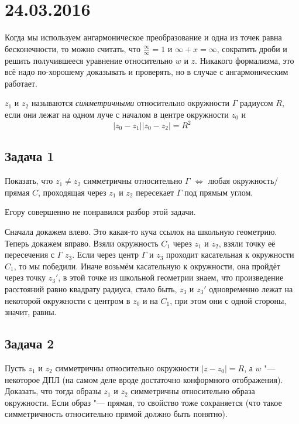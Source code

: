 \chapter{24.03.2016}

\begin{Rem}
	Когда мы используем ангармоническое преобразование и одна из точек равна бесконечности,
	то можно считать, что $\frac{\infty}{\infty}=1$ и $\infty+x=\infty$, сократить дроби и
	решить получившееся уравнение относительно $w$ и $z$.
	Никакого формализма, это всё надо по-хорошему доказывать и проверять, но в случае с ангармоническим работает.
\end{Rem}

\begin{Def}
	$z_1$  и $z_2$ называются \textit{симметричными} относительно окружности $\Gamma$ радиусом $R$,
	если они лежат на одном луче с началом в центре окружности $z_0$ и
	\[ |z_0-z_1||z_0-z_2| = R^2 \]
\end{Def}

\section{Задача 1}
	Показать, что $z_1 \neq z_2$ симметричны относительно $\Gamma$ $\iff$
	любая окружность/прямая $C$, проходящая через $z_1$ и $z_2$ пересекает $\Gamma$ под прямым углом.

	\begin{Rem}
		Егору совершенно не понравился разбор этой задачи.
	\end{Rem}
	Сначала докажем влево.
	Это какая-то куча ссылок на школьную геометрию.
	Теперь докажем вправо.
	Взяли окружность $C_1$ через $z_1$ и $z_2$, взяли точку её пересечения с $\Gamma$ $z_3$.
	Если через центр $\Gamma$ и $z_3$ проходит касательная к окружности $C_1$, то мы победили.
	Иначе возьмём касательную к окружности, она пройдёт через точку $z_3'$, в этой точке
	из школьной геометрии знаем, что произведение расстояний равно квадрату радиуса,
	стало быть, $z_3$ и $z_3'$ одновременно лежат на некоторой окружности с центром в $z_0$
	и на $C_1$, при этом они с одной стороны, значит, равны.

\section{Задача 2}
	Пусть $z_1$ и $z_2$ симметричны относительно окружности $|z-z_0|=R$,
	а $w$ "--- некоторое ДПЛ (на самом деле вроде достаточно конформного отображения).
	Доказать, что тогда образы $z_1$ и $z_2$ симметричны относительно образа окружности.
	Если образ "--- прямая, то свойство тоже сохраняется
	(что такое симметричность относительно прямой должно быть понятно).

